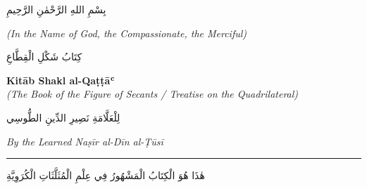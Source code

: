 \documentclass[11pt,a4paper]{article}
\theoremstyle{plain}
\theoremstyle{definition}
\theoremstyle{remark}
\newcommand{\shortline}{\noindent\rule{0.5\textwidth}{0.4pt}\par}
\newcommand{\ar}[1]{{\arabicfont\beginR #1\endR}}
\begin{document}
\clearpage






\thispagestyle{empty}

\begin{center}

\vspace*{1.5cm}



\ar{\Large

بِسْمِ اللهِ الرَّحْمٰنِ الرَّحِيمِ}



\vspace{0.5cm}

{\small\textit{(In the Name of God, the Compassionate, the Merciful)}}\\[1cm]



\ar{\LARGE

كِتَابُ شَكْلِ الْقِطَّاعِ}



\vspace{0.3cm}

{\large\textbf{Kitāb Shakl al-Qaṭṭāʿ}}\\[0.2cm]

{\textit{(The Book of the Figure of Secants / Treatise on the Quadrilateral)}}\\[0.8cm]



\ar{\large

لِلْعَلَّامَةِ نَصِيرِ الدِّينِ الطُّوسِي}



\vspace{0.2cm}

{\textit{By the Learned Naṣīr al-Dīn al-Ṭūsī}}\\[1cm]



\shortline



\vspace{0.8cm}

\ar{\normalsize

هٰذَا هُوَ الْكِتَابُ الْمَشْهُورُ فِي عِلْمِ الْمُثَلَّثَاتِ الْكُرَوِيَّةِ \\

}
\end{center}
\end{document}
